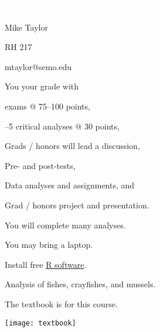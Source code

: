 \documentclass[t]{beamer}
\begin{document}


{
\begin{frame}[b,plain]{\textcolor{white}{BI 438 / 638: Biogeography}}

\end{frame}
}

{
\begin{frame}[t,plain]
\large
\vspace{5ex}
\hangpara\hspace{17em} Mike Taylor

\hangpara\hspace{17em} RH 217

\hangpara\hspace{17em} mtaylor@semo.edu

\end{frame}
}

\begin{frame}[t,plain]{You  your grade with }

	 exams @ 75--100 points, 

	--5 critical analyses @ 30 points, 

		\hspace{2em} Grads / honors will lead a discussion,

	\hangpara Pre- and post-tests,
	
	\hangpara Data analyses and assignments, and
	
	\hangpara Grad / honors project and presentation.
	
\end{frame}

{
\begin{frame}[t,plain]{You will complete many analyses.}

	\hangpara You may bring a laptop.
	
	\hangpara Install free \href{https://www.r-project.org/}{R software}.
	
	\hangpara Analysis of fishes, crayfishes, and mussels.

\end{frame}
}


\begin{frame}[t,plain]{The textbook is  for this course.}
	\begin{center}
		\texttt{[image: textbook]}
	\end{center}
\end{frame}
\end{document}
